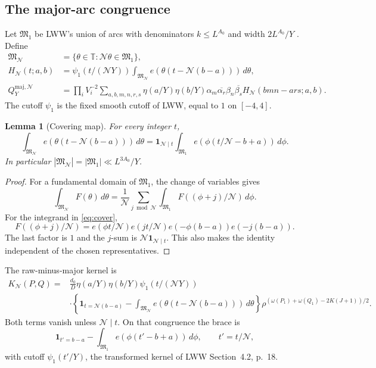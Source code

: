 \documentclass[11pt]{article}
\newtheorem{lemma}[theorem]{Lemma}
\theoremstyle{definition}
\newcommand{\ind}{\mathbf 1}
\newcommand{\GN}{\mathcal N}
\newcommand{\T}{\mathbb T}
\newcommand{\Qmaj}{Q_Y^{\mathrm{maj},\GN}}
\newcommand{\MN}{\mathfrak M_{\GN}}
\newcommand{\Mone}{\mathfrak M_1}
\newcommand{\LWW}[1]{\cite[#1]{LWW}}
\theoremstyle{remark}
\numberwithin{equation}{section}
\begin{document}
\subsection{The major-arc congruence}\label{subsec:kernel}
Let $\Mone$ be LWW's union of arcs with denominators
$k\le L^{A_0}$ and width $2L^{A_0}/Y$
\LWW{Section~4.1, p.~16}. Define
\begin{equation}\label{eq:arc-kernel}
 \begin{split}
 \MN&=\{\theta\in\T:\GN\theta\in\Mone\},\\
 H_{\GN}(t;a,b)&=\psi_1(t/(\GN Y))
 \int_{\MN}e(\theta(t-\GN(b-a)))\,d\theta,\\
 \Qmaj&=\prod_iV_i^{-2}
 \sum_{a,b,m,n,r,s}\eta(a/Y)\eta(b/Y)
 \alpha_m\overline{\alpha_r}\beta_n\overline{\beta_s}
 H_{\GN}(bmn-ars;a,b).
 \end{split}
\end{equation}
The cutoff $\psi_1$ is the fixed smooth cutoff of LWW, equal to $1$
on $[-4,4]$.
\begin{lemma}[Covering map]\label{lem:cover}
For every integer $t$,
\begin{equation}\label{eq:cover}
 \int_{\MN}e(\theta(t-\GN(b-a)))\,d\theta
 =\ind_{\GN\mid t}\int_{\Mone}e(\phi(t/\GN-b+a))\,d\phi.
\end{equation}
In particular $|\MN|=|\Mone|\ll L^{3A_0}/Y$.
\end{lemma}
\begin{proof}
For a fundamental domain of $\Mone$, the change of variables gives
\[
 \int_{\MN}F(\theta)\,d\theta
 =\frac1{\GN}\sum_{j\bmod\GN}\int_{\Mone}F((\phi+j)/\GN)\,d\phi.
\]
For the integrand in \eqref{eq:cover},
\[
 F((\phi+j)/\GN)
 =e(\phi t/\GN)e(jt/\GN)e(-\phi(b-a))e(-j(b-a)).
\]
The last factor is $1$ and the $j$-sum is
$\GN\ind_{\GN\mid t}$. This also makes the identity independent of
the chosen representatives.
\end{proof}
The raw-minus-major kernel is
\begin{equation}\label{eq:K}
 \begin{split}
 K_{\GN}(P,Q)={}&\frac{d_0}{D}\eta(a/Y)\eta(b/Y)\psi_1(t/(\GN Y))\\
 &\cdot\left\{\ind_{t=\GN(b-a)}
 -\int_{\MN}e(\theta(t-\GN(b-a)))\,d\theta\right\}
 \rho^{(\omega(P_1)+\omega(Q_1)-2K(J+1))/2}.
 \end{split}
\end{equation}
Both terms vanish unless $\GN\mid t$. On that congruence the brace is
\begin{equation}\label{eq:reduced-brace}
 \ind_{t'=b-a}-\int_{\Mone}e(\phi(t'-b+a))\,d\phi,
 \qquad t'=t/\GN,
\end{equation}
with cutoff $\psi_1(t'/Y)$, the transformed kernel of LWW
Section~4.2, p.~18.
\end{document}
